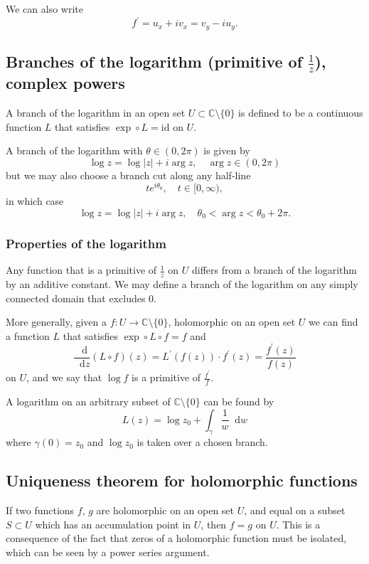 \documentclass{article}
\newcommand\dif{\mathop{}\!\mathrm{d}}
\begin{document}
We can also write
$$
f^\prime = u_x + i v_x = v_y - i u_y.
$$

\subsection{Branches of the logarithm (primitive of $\frac{1}{z}$),
                  complex powers}

A branch of the logarithm in an open set
$U \subset \mathbb{C} \setminus \{ 0 \}$ is defined to be
a continuous function $L$ that satisfies
$\exp \circ L = \mathrm{id}$ on $U$.

A branch of the logarithm with $\theta \in (0, 2 \pi)$ is
given by
$$
  \log z
= \log |z| + i \arg z, \quad
  \arg z \in (0, 2 \pi)
$$
but we may also choose a branch cut along any half-line
$$
  t e^{i \theta_0}, \quad
  t \in [0, \infty),
$$
in which case
$$
  \log z
= \log |z| + i \arg z, \quad
  \theta_0 < \arg z < \theta_0 + 2 \pi.
$$

\subsubsection{Properties of the logarithm}
Any function that is a primitive of $\frac{1}{z}$ on $U$
differs from a branch of the logarithm by an additive
constant. We may define a branch of the logarithm on
any simply connected domain that excludes 0.

More generally, given a
$f: U \to \mathbb{C} \setminus \{ 0 \}$,
holomorphic on an open set $U$
we can find a function $L$ that satisfies
$\exp \circ L \circ f = f$ and
$$
  \frac{\dif}{\dif z}
  (L \circ f)(z)
= L^\prime(f(z)) \cdot f^\prime(z)
= \frac{f^\prime(z)}
       {f(z)}
$$
on $U$, and we say that $\log f$ is a primitive of
$\frac{f^\prime}{f}$.

A logarithm on an arbitrary subset of
$\mathbb{C} \setminus \{ 0 \}$ can be found by
$$
  L(z)
= \log z_0 + \int_\gamma \frac{1}{w} \dif w
$$
where $\gamma(0) = z_0$ and $\log z_0$ is taken over a chosen
branch.

\subsection{Uniqueness theorem for holomorphic functions}

If two functions $f$, $g$ are holomorphic on an open set
$U$, and equal on a subset $S \subset U$ which has an
accumulation point in $U$, then $f = g$ on $U$. This is a
consequence of the fact that zeros of a holomorphic function
must be isolated, which can be seen by a power series
argument.
\end{document}
